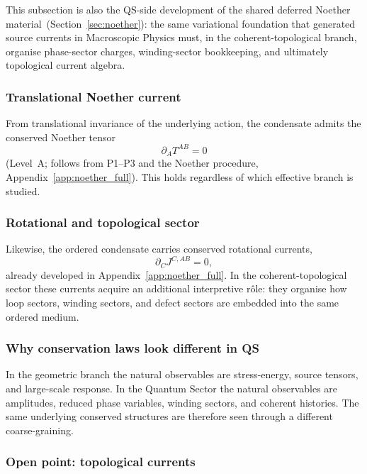 \documentclass[11pt,a4paper]{article}
\numberwithin{equation}{section}
\begin{document}
This subsection is also the QS-side development of the shared
deferred Noether material~(Section~\ref{sec:noether}):
the same variational foundation that generated source currents in
Macroscopic Physics must, in the coherent-topological branch,
organise phase-sector charges, winding-sector bookkeeping, and
ultimately topological current algebra.

\subsubsection*{Translational Noether current}

From translational invariance of the underlying action, the condensate
admits the conserved Noether tensor
\begin{equation}
  \label{eq:qs_noether_T}
  \partial_A T^{AB} = 0
\end{equation}
(Level~A; follows from P1--P3 and the Noether procedure,
Appendix~\ref{app:noether_full}).
This holds regardless of which effective branch is studied.

\subsubsection*{Rotational and topological sector}

Likewise, the ordered condensate carries conserved rotational currents,
\begin{equation}
  \label{eq:qs_noether_J}
  \partial_C J^{C,AB} = 0,
\end{equation}
already developed in Appendix~\ref{app:noether_full}.
In the coherent-topological sector these currents acquire an additional
interpretive rôle: they organise how loop sectors, winding sectors, and
defect sectors are embedded into the same ordered medium.

\subsubsection*{Why conservation laws look different in QS}

In the geometric branch the natural observables are stress-energy,
source tensors, and large-scale response.
In the Quantum Sector the natural observables are amplitudes, reduced
phase variables, winding sectors, and coherent histories.
The same underlying conserved structures are therefore seen through a
different coarse-graining.

\subsubsection*{Open point: topological currents}
\end{document}
